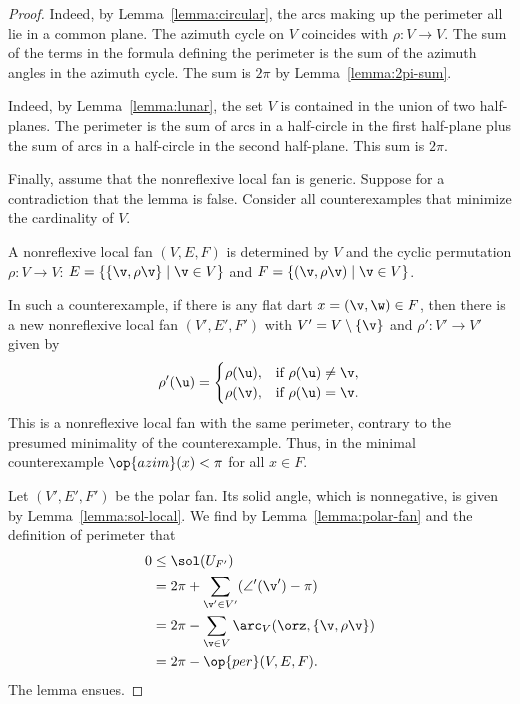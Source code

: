 \begin{proof} 
  Indeed, by Lemma~\ref{lemma:circular},
the arcs making up the perimeter all lie in a common plane.  The
azimuth cycle on $V$ coincides with $\rho:V\to V$.  The sum of the
terms in the formula defining the perimeter is the sum of the
azimuth angles in the azimuth cycle.  The sum is $2\pi$ by
Lemma~\ref{lemma:2pi-sum}.


  Indeed, by Lemma~\ref{lemma:lunar}, the
set $V$ is contained in the union of two half-planes.  The perimeter
is the sum of arcs in a half-circle in the first half-plane plus the
sum of arcs in a half-circle in the second half-plane. This sum is
$2\pi$.

Finally, assume that the nonreflexive local fan is generic.  Suppose for a
contradiction that the lemma is false.  Consider all counterexamples
that minimize the cardinality of $V$.  

A nonreflexive local fan $(V,E,F)$ is determined by $V$ and the cyclic
permutation $\rho:V\to V$: $E=\{\{\v,\rho \v\}\mid \v\in V\}$ and $F
= \{(\v,\rho \v)\mid \v\in V\}$.

In such a counterexample, if there is any flat dart $x=(\v,\w)\in F$,
then there is a new nonreflexive local fan $(V',E',F')$ with $V' =
V\setminus\{\v\}$ and $\rho':V'\to V'$ given by
\[ 
\rho'(\u) = \begin{cases}
\rho(\u), & \text{if } \rho(\u)\ne \v,\\
\rho(\v), & \text{if }\rho(\u) = \v.\\
\end{cases}
\] 
This is a nonreflexive local fan with the same perimeter, contrary to the presumed
minimality of the counterexample.  Thus, in the minimal counterexample
$\op{azim}(x) <\pi$ for all $x\in F$.

Let $(V',E',F')$ be the polar fan.  Its solid angle, which is nonnegative, is given by
Lemma~\ref{lemma:sol-local}.  We find by Lemma~\ref{lemma:polar-fan}
and the definition of perimeter that
\begin{align*}
0 &\le \sol(U_{F'}) \\
    &= 2\pi + \sum_{\v'\in V'} (\angle'(\v') - \pi)\\
    &= 2\pi - \sum_{\v\in V} \arc_V(\orz,\{\v,\rho\v\})\\
    &= 2\pi - \op{per}(V,E,F).
\end{align*}
The lemma ensues.
\end{proof}


